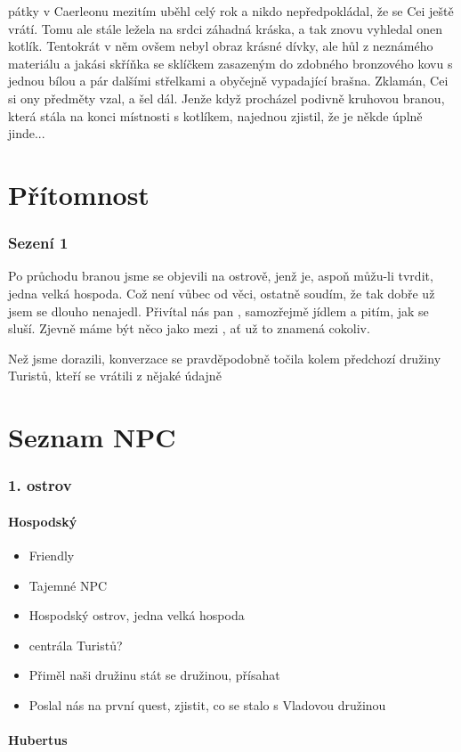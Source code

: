 \documentclass[a4paper,twocolumn,openany,nodeprecatedcode, justified]{dndbook}
\newcommand{\bi}{\begin{itemize}}
\newcommand{\ei}{\end{itemize}}
\begin{document}
	pátky v Caerleonu mezitím uběhl celý rok a nikdo nepředpokládal, že se Cei ještě vrátí. Tomu ale stále ležela na srdci záhadná kráska, a tak znovu vyhledal onen kotlík. Tentokrát v něm ovšem nebyl obraz krásné dívky, ale hůl z neznámého materiálu a jakási skříňka se sklíčkem zasazeným do zdobného bronzového kovu s jednou bílou a pár dalšími střelkami a obyčejně vypadající brašna. Zklamán, Cei si ony předměty vzal, a šel dál. Jenže když procházel podivně kruhovou branou, která stála na konci místnosti s kotlíkem, najednou zjistil, že je někde úplně jinde...
	
	
	\part{Přítomnost}
	\section{Sezení 1}
	Po průchodu branou jsme se objevili na ostrově, jenž je, aspoň můžu-li tvrdit, jedna velká hospoda. Což není vůbec od věci, ostatně soudím, že tak dobře už jsem se dlouho nenajedl. Přivítal nás pan , samozřejmě jídlem a pitím, jak se sluší. Zjevně máme být něco jako  mezi , ať už to znamená cokoliv.
	
	Než jsme dorazili, konverzace se pravděpodobně točila kolem předchozí družiny Turistů, kteří se vrátili z nějaké údajně 
	
	\part{Seznam NPC}
	\section{1. ostrov}
	\subsection{Hospodský}
	\bi
		\item Friendly
		\item Tajemné NPC
		\item Hospodský ostrov, jedna velká hospoda
		\item centrála Turistů?
		\item Přiměl naši družinu stát se družinou, přísahat
		\item Poslal nás na první quest, zjistit, co se stalo s Vladovou družinou
	\ei
	\subsection{Hubertus}
	
	
	
\end{document}
